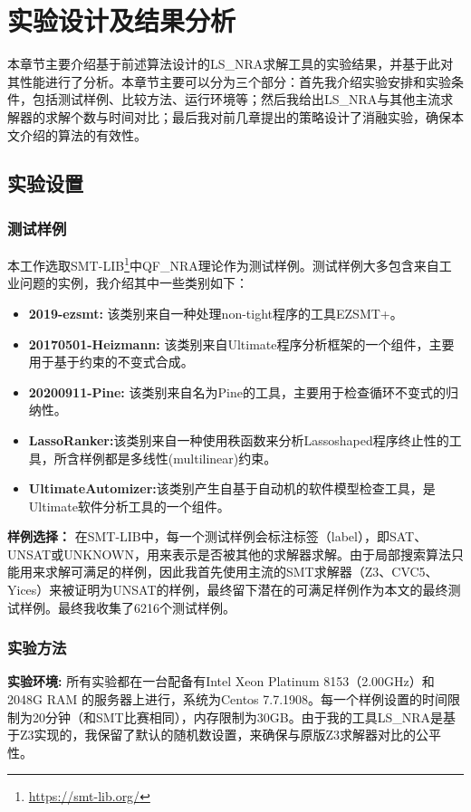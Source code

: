 \chapter{实验设计及结果分析}\label{chap:Result}

本章节主要介绍基于前述算法设计的LS\_NRA求解工具的实验结果，并基于此对其性能进行了分析。本章节主要可以分为三个部分：首先我介绍实验安排和实验条件，包括测试样例、比较方法、运行环境等；然后我给出LS\_NRA与其他主流求解器的求解个数与时间对比；最后我对前几章提出的策略设计了消融实验，确保本文介绍的算法的有效性。

\section{实验设置}
\subsection{测试样例}
本工作选取SMT-LIB\footnote{\url{https://smt-lib.org/}}中QF\_NRA理论作为测试样例。测试样例大多包含来自工业问题的实例，我介绍其中一些类别如下：

\begin{itemize}
    \item \textbf{2019-ezsmt\cite{SusmanL16, ShenL18}:} 该类别来自一种处理non-tight程序的工具EZSMT+。
    \item \textbf{20170501-Heizmann\cite{Heizmann}:} 该类别来自Ultimate程序分析框架的一个组件，主要用于基于约束的不变式合成。
    \item \textbf{20200911-Pine\cite{Pine}:} 该类别来自名为Pine的工具，主要用于检查循环不变式的归纳性。
    \item \textbf{LassoRanker\cite{LeikeH15, HeizmannHLP13, Lasso3}:}该类别来自一种使用秩函数来分析Lassoshaped程序终止性的工具，所含样例都是多线性(multilinear)约束。
    \item \textbf{UltimateAutomizer:}该类别产生自基于自动机的软件模型检查工具，是Ultimate软件分析工具的一个组件。
\end{itemize}

\textbf{样例选择：} 在SMT-LIB中，每一个测试样例会标注标签（label），即SAT、UNSAT或UNKNOWN，用来表示是否被其他的求解器求解。由于局部搜索算法只能用来求解可满足的样例，因此我首先使用主流的SMT求解器（Z3、CVC5、Yices）来被证明为UNSAT的样例，最终留下潜在的可满足样例作为本文的最终测试样例。最终我收集了6216个测试样例。


\subsection{实验方法}
 \textbf{实验环境:} 所有实验都在一台配备有Intel Xeon Platinum 8153（2.00GHz）和2048G RAM 的服务器上进行，系统为Centos 7.7.1908。每一个样例设置的时间限制为20分钟（和SMT比赛相同），内存限制为30GB。由于我的工具LS\_NRA是基于Z3实现的，我保留了默认的随机数设置，来确保与原版Z3求解器对比的公平性。

